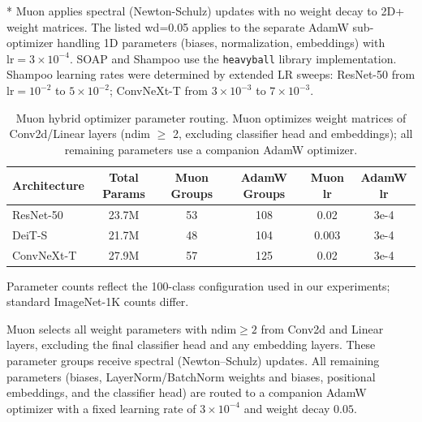 \begin{table}[t]
\begin{tabular}{@{}llccccc@{}}
\bottomrule
\end{tabular}
\vspace{0.5em}
\par\noindent\footnotesize{* Muon applies spectral (Newton-Schulz) updates with no weight decay to 2D+ weight matrices. The listed wd=0.05 applies to the separate AdamW sub-optimizer handling 1D parameters (biases, normalization, embeddings) with $\text{lr}=3\times10^{-4}$. SOAP and Shampoo use the \texttt{heavyball} library implementation. Shampoo learning rates were determined by extended LR sweeps: ResNet-50 from $\text{lr}{=}10^{-2}$ to $5{\times}10^{-2}$; ConvNeXt-T from $3{\times}10^{-3}$ to $7{\times}10^{-3}$.}
\end{table}

\begin{table}[h]
\centering
\caption{Muon hybrid optimizer parameter routing. Muon optimizes weight matrices of Conv2d/Linear layers (ndim $\geq$ 2, excluding classifier head and embeddings); all remaining parameters use a companion AdamW optimizer.}
\label{tab:muon_routing}
\small
\begin{tabular}{lccccc}
\toprule
Architecture & Total Params & Muon Groups & AdamW Groups & Muon lr & AdamW lr \\
\midrule
ResNet-50 & 23.7M & 53 & 108 & 0.02 & 3e-4 \\
DeiT-S & 21.7M & 48 & 104 & 0.003 & 3e-4 \\
ConvNeXt-T & 27.9M & 57 & 125 & 0.02 & 3e-4 \\
\bottomrule
\end{tabular}
\vspace{0.3em}
\par\noindent\footnotesize{Parameter counts reflect the 100-class configuration used in our experiments; standard ImageNet-1K counts differ.}
\end{table}

Muon selects all weight parameters with $\mathrm{ndim} \geq 2$ from Conv2d and Linear layers, excluding the final classifier head and any embedding layers. These parameter groups receive spectral (Newton--Schulz) updates. All remaining parameters (biases, LayerNorm/BatchNorm weights and biases, positional embeddings, and the classifier head) are routed to a companion AdamW optimizer with a fixed learning rate of $3 \times 10^{-4}$ and weight decay $0.05$.

